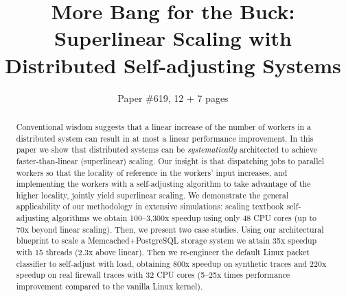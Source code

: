 \documentclass[sigconf,10pt]{acmart}
\begin{document}


\title{More Bang for the Buck: Superlinear Scaling with Distributed Self-adjusting Systems}

\author{Paper \#619, 12 + 7 pages}

\begin{abstract}
  Conventional wisdom suggests that a linear increase of the number of workers in a distributed system can result in at most a linear performance improvement.  In this paper we show that distributed systems can be \emph{systematically} architected to achieve faster-than-linear (superlinear) scaling. Our insight is that dispatching jobs to parallel workers so that the locality of reference in the workers' input increases, and implementing the workers with a self-adjusting algorithm to take advantage of the higher locality, jointly yield superlinear scaling. We demonstrate the general applicability of our methodology in extensive simulations: scaling textbook self-adjusting algorithms we obtain 100--3,300x speedup using only 48 CPU cores (up to 70x beyond linear scaling). Then, we present two case studies. Using our architectural blueprint to scale a Memcached+PostgreSQL storage system we attain 35x speedup with 15 threads (2.3x above linear). Then we re-engineer the default Linux packet classifier to self-adjust with load, obtaining 800x speedup on synthetic traces and 220x speedup on real firewall traces with 32 CPU cores (5--25x times performance improvement compared to the vanilla Linux kernel).
\end{abstract}

\maketitle


  














% 

 
\begin{small}

\end{small}


\end{document}
